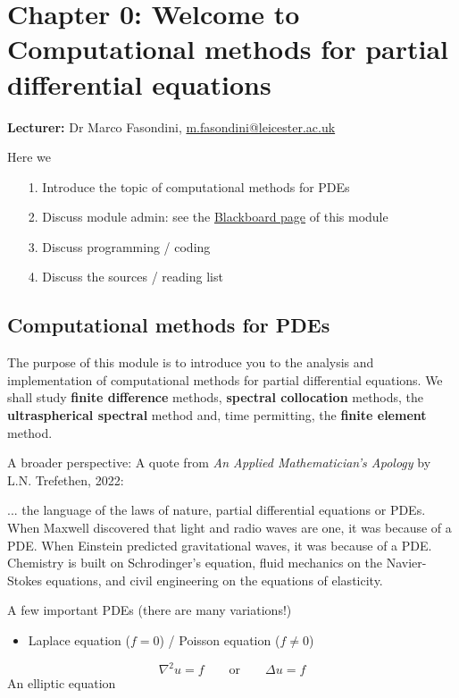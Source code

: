 \documentclass[12pt,a4paper]{article}
\begin{document}
\section{Chapter 0: Welcome to Computational methods for partial differential equations}
\textbf{Lecturer:} Dr Marco Fasondini, \href{mailto:m.fasondini@leicester.ac.uk}{m.fasondini@leicester.ac.uk}

Here we

\begin{itemize}
\item[1. ] Introduce the topic of computational methods for PDEs


\item[2. ] Discuss module admin: see the \href{https://blackboard.le.ac.uk/}{Blackboard page} of this module


\item[3. ] Discuss programming / coding 


\item[4. ] Discuss the sources / reading list

\end{itemize}
\subsection{Computational methods for PDEs}
The purpose of this module is to introduce you to the analysis and implementation of computational methods for partial differential equations.  We shall study \textbf{finite difference} methods, \textbf{spectral collocation} methods, the \textbf{ultraspherical spectral} method and, time permitting, the \textbf{finite element} method.  

A broader perspective: A quote from \emph{An Applied Mathematician's Apology} by L.N. Trefethen, 2022:

... the language of the laws of nature, partial differential equations or PDEs. When Maxwell discovered that light and radio waves are one, it was because of a PDE. When Einstein predicted gravitational waves, it was because     of a PDE. Chemistry is built on Schrodinger's equation, fluid mechanics on the Navier-Stokes equations, and civil engineering on the equations of elasticity.

A few important PDEs (there are many variations!)

\begin{itemize}
\item Laplace equation ($f = 0$) / Poisson equation ($f \neq 0$) 

\end{itemize}
\[
\nabla^2 u = f   \qquad \text{or} \qquad \Delta u = f
\]
An elliptic equation
\end{document}
